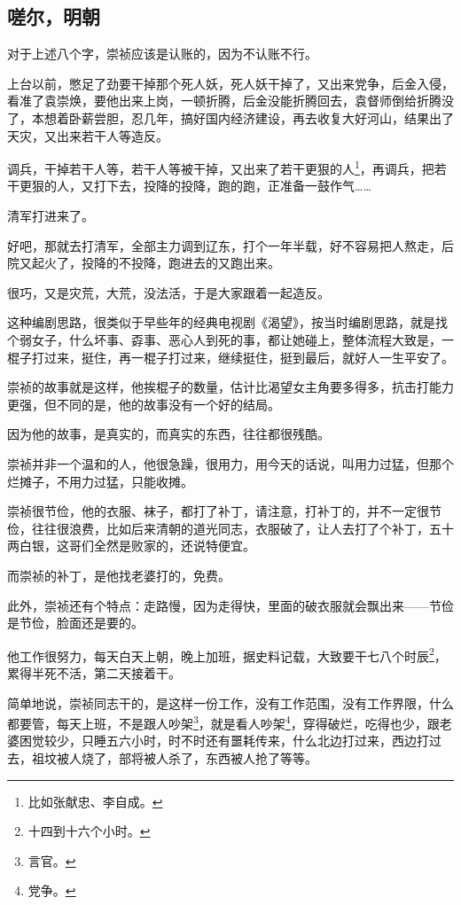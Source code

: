 \begin{multicols}{\theparacolNo}
\subsection{嗟尔，明朝}
对于上述八个字，崇祯应该是认账的，因为不认账不行。

上台以前，憋足了劲要干掉那个死人妖，死人妖干掉了，又出来党争，后金入侵，看准了袁崇焕，要他出来上岗，一顿折腾，后金没能折腾回去，袁督师倒给折腾没了，本想着卧薪尝胆，忍几年，搞好国内经济建设，再去收复大好河山，结果出了天灾，又出来若干人等造反。

调兵，干掉若干人等，若干人等被干掉，又出来了若干更狠的人\footnote{比如张献忠、李自成。}，再调兵，把若干更狠的人，又打下去，投降的投降，跑的跑，正准备一鼓作气……

清军打进来了。

好吧，那就去打清军，全部主力调到辽东，打个一年半载，好不容易把人熬走，后院又起火了，投降的不投降，跑进去的又跑出来。

很巧，又是灾荒，大荒，没法活，于是大家跟着一起造反。

这种编剧思路，很类似于早些年的经典电视剧《渴望》，按当时编剧思路，就是找个弱女子，什么坏事、孬事、恶心人到死的事，都让她碰上，整体流程大致是，一棍子打过来，挺住，再一棍子打过来，继续挺住，挺到最后，就好人一生平安了。

崇祯的故事就是这样，他挨棍子的数量，估计比渴望女主角要多得多，抗击打能力更强，但不同的是，他的故事没有一个好的结局。

因为他的故事，是真实的，而真实的东西，往往都很残酷。

崇祯并非一个温和的人，他很急躁，很用力，用今天的话说，叫用力过猛，但那个烂摊子，不用力过猛，只能收摊。

崇祯很节俭，他的衣服、袜子，都打了补丁，请注意，打补丁的，并不一定很节俭，往往很浪费，比如后来清朝的道光同志，衣服破了，让人去打了个补丁，五十两白银，这哥们全然是败家的，还说特便宜。

而崇祯的补丁，是他找老婆打的，免费。

此外，崇祯还有个特点：走路慢，因为走得快，里面的破衣服就会飘出来——节俭是节俭，脸面还是要的。

他工作很努力，每天白天上朝，晚上加班，据史料记载，大致要干七八个时辰\footnote{十四到十六个小时。}，累得半死不活，第二天接着干。

简单地说，崇祯同志干的，是这样一份工作，没有工作范围，没有工作界限，什么都要管，每天上班，不是跟人吵架\footnote{言官。}，就是看人吵架\footnote{党争。}，穿得破烂，吃得也少，跟老婆困觉较少，只睡五六小时，时不时还有噩耗传来，什么北边打过来，西边打过去，祖坟被人烧了，部将被人杀了，东西被人抢了等等。


\end{multicols}
